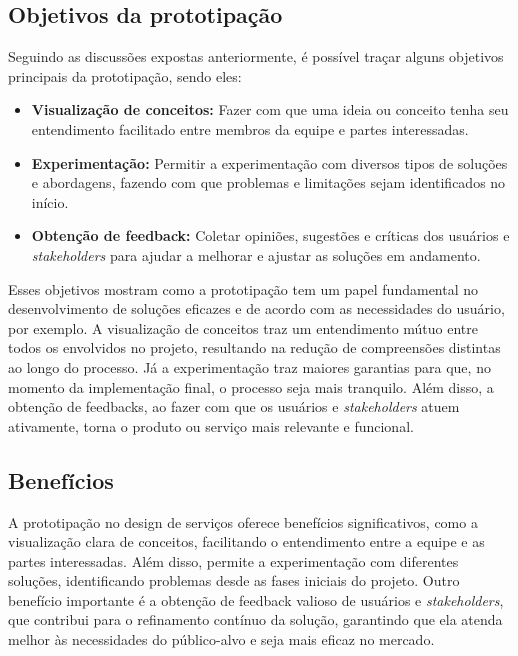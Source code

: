 \subsection{Objetivos da prototipação}

Seguindo as discussões expostas anteriormente, é possível traçar alguns objetivos principais da prototipação, sendo eles:

\begin{itemize}
	\item \textbf{Visualização de conceitos:} Fazer com que uma ideia ou conceito tenha seu entendimento facilitado entre membros da equipe e partes interessadas.
	
	\item \textbf{Experimentação:} Permitir a experimentação com diversos tipos de soluções e abordagens, fazendo com que problemas e limitações sejam identificados no início.
	
	\item \textbf{Obtenção de feedback:} Coletar opiniões, sugestões e críticas dos usuários e \textit{stakeholders} para ajudar a melhorar e ajustar as soluções em andamento.
\end{itemize}

Esses objetivos mostram como a prototipação tem um papel fundamental no desenvolvimento de soluções eficazes e de acordo com as necessidades do usuário, por exemplo. A visualização de conceitos traz um entendimento mútuo entre todos os envolvidos no projeto, resultando na redução de compreensões distintas ao longo do processo. Já a experimentação traz maiores garantias para que, no momento da implementação final, o processo seja mais tranquilo. Além disso, a obtenção de feedbacks, ao fazer com que os usuários e \textit{stakeholders} atuem ativamente, torna o produto ou serviço mais relevante e funcional.

\subsection{Benefícios}

A prototipação no design de serviços oferece benefícios significativos, como a visualização clara de conceitos, facilitando o entendimento entre a equipe e as partes interessadas. Além disso, permite a experimentação com diferentes soluções, identificando problemas desde as fases iniciais do projeto. Outro benefício importante é a obtenção de feedback valioso de usuários e \textit{stakeholders}, que contribui para o refinamento contínuo da solução, garantindo que ela atenda melhor às necessidades do público-alvo e seja mais eficaz no mercado.



